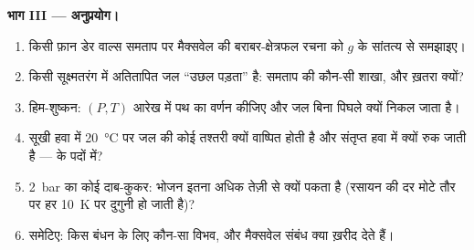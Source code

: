 \begin{problem}
\textbf{भाग III --- अनुप्रयोग।}
\begin{enumerate}[resume]
  \item किसी फ़ान डेर वाल्स समताप पर मैक्सवेल की बराबर-क्षेत्रफल रचना को
        $g$ के सांतत्य से समझाइए।
  \item किसी सूक्ष्मतरंग में अतितापित जल ``उछल पड़ता'' है: समताप की कौन-सी
        शाखा, और ख़तरा क्यों?
  \item हिम-शुष्कन: $(P,T)$ आरेख में पथ का वर्णन कीजिए और
        जल बिना पिघले क्यों निकल जाता है।
  \item सूखी हवा में \qty{20}{\celsius} पर जल की कोई तश्तरी क्यों वाष्पित होती है
        और संतृप्त हवा में क्यों रुक जाती है ---  के पदों में?
  \item \qty{2}{bar} का कोई दाब-कुकर: भोजन इतना अधिक तेज़ी से क्यों पकता है
        (रसायन की दर मोटे तौर पर हर \qty{10}{K} पर दुगुनी हो
        जाती है)?
  \item समेटिए: किस बंधन के लिए कौन-सा विभव, और मैक्सवेल संबंध
        क्या ख़रीद देते हैं।
\end{enumerate}
\end{problem}
